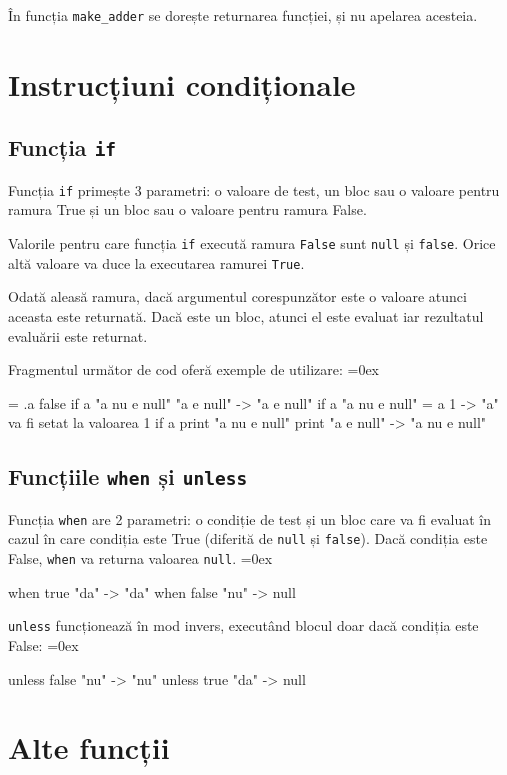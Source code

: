 \documentclass[12pt,a4paper]{memoir}
\renewcommand{\c}{\texttt}
\newenvironment{code}
{
\definecolor{shadecolor}{gray}{0.91}
\topsep=0ex
\relax
\shaded
\verbatim
}
{
\endverbatim
\endshaded
}
\begin{document}
În funcția \c{make\_adder} se dorește returnarea funcției, și nu apelarea acesteia.

\section{Instrucțiuni condiționale}

\subsection{Funcția \c{if}}

Funcția \c{if} primește 3 parametri: o valoare de test, un bloc sau o valoare pentru ramura True și un bloc sau o valoare pentru ramura False. 

Valorile pentru care funcția \c{if} execută ramura \c{False} sunt \c{null} și \c{false}. Orice altă valoare va duce la executarea ramurei \c{True}.

Odată aleasă ramura, dacă argumentul corespunzător este o valoare atunci aceasta este returnată. Dacă este un bloc, atunci el este evaluat iar rezultatul evaluării este returnat.

Fragmentul următor de cod oferă exemple de utilizare:
\begin{code}
= .a false
if a "a nu e null" "a e null"
  -> "a e null"
if a "a nu e null" { = a 1 }
  -> "a" va fi setat la valoarea 1
if a { print "a nu e null" } { print "a e null" }
  -> "a nu e null"
\end{code}

\subsection{Funcțiile \c{when} și \c{unless}}

Funcția \c{when} are 2 parametri: o condiție de test și un bloc care va fi evaluat în cazul în care condiția este True (diferită de \c{null} și \c{false}). Dacă condiția este False, \c{when} va returna valoarea \c{null}.
\begin{code}
when true { "da" }
  -> "da"
when false { "nu" }
  -> null
\end{code}

\c{unless} funcționează în mod invers, executând blocul doar dacă condiția este False:
\begin{code}
unless false { "nu" }
  -> "nu"
unless true { "da" }
  -> null
\end{code}

\section{Alte funcții}
\end{document}
